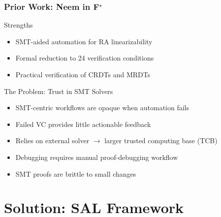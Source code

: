 \documentclass[usepdftitle=false]{beamer}
\newcommand{\fstar}{F$^{\star}$\xspace}
\begin{document}
\begin{frame}
  \frametitle{Prior Work: Neem in \fstar}
  
  \begin{block}{Strengths}
    \begin{itemize}[<+->]
      \item SMT-aided automation for RA linearizability
      \item Formal reduction to 24 verification conditions
      \item Practical verification of CRDTs and MRDTs
    \end{itemize}
  \end{block}
  
  \vspace{0.3cm}
  \begin{block}{The Problem: Trust in SMT Solvers}
    \begin{itemize}[<+->]
      \item SMT-centric workflows are opaque when automation fails
      \item Failed VC provides little actionable feedback
      \item Relies on external solver $\rightarrow$ larger trusted computing base (TCB)
      \item Debugging requires manual proof-debugging workflow
      \item SMT proofs are brittle to small changes
    \end{itemize}
  \end{block}
\end{frame}

\section{Solution: SAL Framework}
\end{document}
